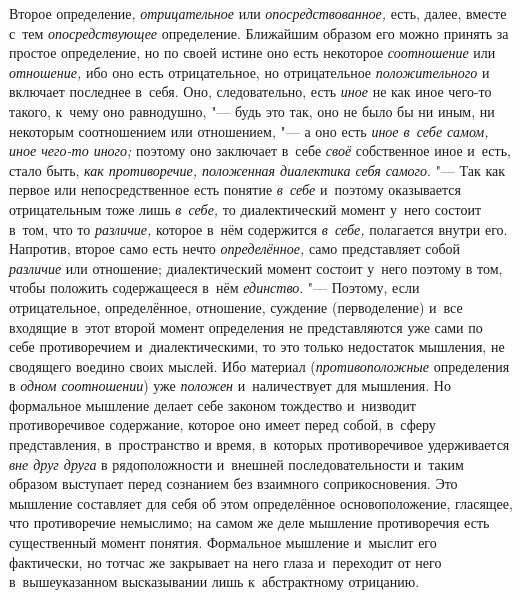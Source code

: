 Второе определение, {\em отрицательное} или
{\em опосредствованное,} есть, далее, вместе с~тем {\em опосредствующее}
определение. Ближайшим образом его можно принять за простое
определение, но по своей истине оно есть некоторое
{\em соотношение} или {\em отношение,} ибо оно
есть отрицательное, но отрицательное {\em положительного} и
включает последнее в~себя. Оно, следовательно, есть {\em иное} не как
иное чего-то такого, к~чему оно равнодушно, "--- будь это
так, оно не было бы ни иным, ни некоторым соотношением или отношением, "---
а оно есть {\em иное в~себе самом, иное чего-то иного;}
поэтому оно заключает в~себе
{\em своё} собственное иное и~есть, стало быть, {\em как
противоречие, положенная диалектика себя самого}. "--- Так как
первое или непосредственное есть понятие {\em в~себе} и~поэтому
оказывается отрицательным тоже лишь {\em в~себе,} то
диалектический момент у~него состоит в~том, что то
{\em различие,} которое в~нём содержится {\em в~себе,}
полагается внутри его. Напротив, второе само есть нечто
{\em определённое,} само представляет собой {\em различие}
или отношение; диалектический момент состоит у~него поэтому в
том, чтобы положить содержащееся в~нём {\em единство}. "---
Поэтому, если отрицательное, определённое, отношение,
суждение (перводеление) и~все входящие в~этот второй момент определения не
представляются уже сами по себе противоречием и~диалектическими, то это
только недостаток мышления, не сводящего воедино своих мыслей. Ибо материал
({\em противоположные} определения в {\em одном соотношении}) уже
{\em положен} и~наличествует для мышления. Но формальное мышление делает
себе законом тождество и~низводит противоречивое содержание,
которое оно имеет перед собой, в~сферу представления, в~пространство и
время, в~которых противоречивое удерживается {\em вне друг друга} в
рядоположности и~внешней последовательности и~таким образом выступает перед
сознанием без взаимного соприкосновения. Это мышление составляет для себя
об этом определённое основоположение, гласящее, что противоречие немыслимо;
на самом же деле мышление противоречия есть существенный момент понятия.
Формальное мышление и~мыслит его фактически, но тотчас же закрывает на него
глаза и~переходит от него в~вышеуказанном высказывании лишь к~абстрактному
отрицанию.

